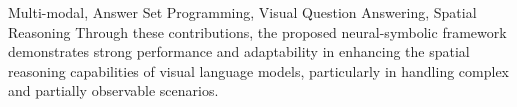\begin{englishabstract}{Multi-modal, Answer Set Programming, Visual Question Answering, Spatial Reasoning}
Through these contributions, the proposed neural-symbolic framework demonstrates strong performance and adaptability in enhancing the spatial reasoning capabilities of visual language models, particularly in handling complex and partially observable scenarios.
\end{englishabstract}

\tableofcontents
\listofothers
